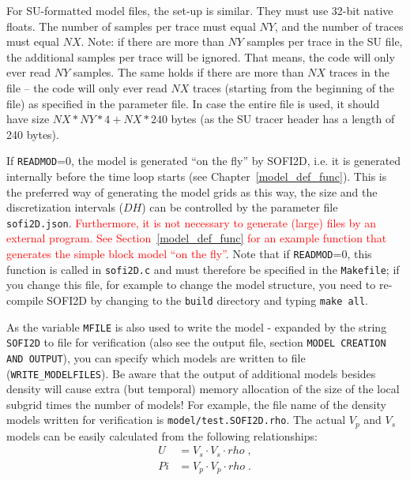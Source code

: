 For SU-formatted model files, the set-up is similar. They must use 32-bit native floats. The number of samples per trace must equal $NY$, and the number of traces must equal $NX$. Note: if there are more than $NY$ samples per trace in the SU file, the additional samples per trace will be ignored. That means, the code will only ever read $NY$ samples. The same holds if there are more than $NX$ traces in the file -- the code will only ever read $NX$ traces (starting from the beginning of the file) as specified in the parameter file. In case the entire file is used, it should have size $NX*NY*4+NX*240$ bytes (as the SU tracer header has a length of 240 bytes).

If \texttt{READMOD}=0, the model is generated \enquote{on the fly} by SOFI2D, i.e. it is generated internally before the time loop starts (see Chapter~\ref{model_def_func}). This is the preferred way of generating the model grids as this way, the size and the discretization intervals ($DH$) can be controlled by the parameter file \texttt{sofi2D.json}. \textcolor{red}{Furthermore, it is not necessary to generate (large) files by an external program. See Section~\ref{model_def_func} for an example function that generates the simple block model \enquote{on the fly}}. Note that if \texttt{READMOD}=0, this function is called in \texttt{sofi2D.c} and must therefore be specified in the \texttt{Makefile}; if you change this file, for example to change the model structure, you need to re-compile SOFI2D by changing to the \texttt{build} directory and typing \texttt{make all}.

As the variable \texttt{MFILE} is also used to write the model - expanded by the string \texttt{SOFI2D} to file for verification (also see the output file, section \texttt{MODEL CREATION AND OUTPUT}), you can specify which models are written to file (\texttt{WRITE\_MODELFILES}). Be aware that the output of additional models besides density will cause extra (but temporal) memory allocation of the size of the local subgrid times the number of models! For example, the file name of the density models written for verification is \texttt{model/test.SOFI2D.rho}. The actual $V_p$ and $V_s$ models can be easily calculated from the following relationships:
\begin{subequations}
    \begin{align}
        U &= V_s \cdot V_s \cdot rho\;,\\
        Pi &= V_p \cdot V_p \cdot rho\;.
        \label{eq_U_PI}
    \end{align}
\end{subequations}
    

